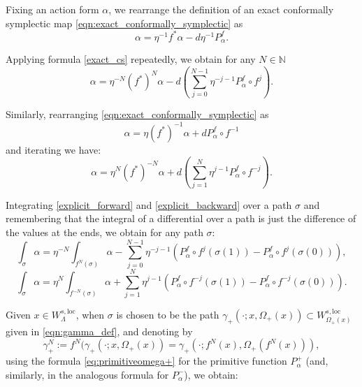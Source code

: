 \documentclass[11pt]{amsart}
\theoremstyle{definition}
\theoremstyle{remark}
\numberwithin{equation}{section}
\newcommand{\N}{\mathbb N}
\begin{document}
\medskip









Fixing an action form $\alpha$, we rearrange the definition of an exact conformally symplectic map \eqref{eqn:exact_conformally_symplectic}
as
\begin{equation}\label{exact_cs}
\alpha = \eta^{-1} f^* \alpha -d \eta^{-1}P^f_\alpha .
\end{equation}

Applying formula \eqref{exact_cs}
repeatedly,   we obtain for any $N \in \N$
\begin{equation}\label{explicit_forward}
	\alpha = \eta^{-N} (f^*)^N  \alpha -
  d \left(\sum_{j= 0}^{N-1}  \eta^{-j-1} P^f_\alpha \circ f^{j} \right).
\end{equation}


Similarly, rearranging \eqref{eqn:exact_conformally_symplectic} as
\[
\alpha = \eta (f^*)^{-1} \alpha + d P^f_\alpha\circ f^{-1}
\]
and
iterating we have:
\begin{equation}\label{explicit_backward}
  \alpha  = \eta^{N} (f^*)^{-N}\alpha +
  d \left(\sum_{j= 1}^N  \eta^{j-1} P^f_\alpha \circ f^{-j} \right).
 \end{equation}


 Integrating \eqref{explicit_forward}  and \eqref{explicit_backward} over a path $\sigma$ and
 remembering that the integral of a differential over a path  is just the difference of the values at the ends, we obtain for
 any path $\sigma$:
 \begin{equation} \label{explicit_forward_path}
   \int_\sigma \alpha =  \eta^{-N} \int_{f^N (\sigma)} \alpha
   - \sum_{j= 0}^{N-1}  \eta^{-j-1} \left( P^f_\alpha \circ f^{j}(\sigma(1)) -
     P^f_\alpha \circ f^{j}(\sigma(0)) \right),
 \end{equation}
 \begin{equation} \label{explicit_backward_path}
   \int_\sigma \alpha =  \eta^{N} \int_{f^{-N} (\sigma)} \alpha
   +\sum_{j= 1}^N  \eta^{j-1} \left( P^f_\alpha \circ f^{-j}(\sigma(1)) -
     P^f_\alpha \circ f^{-j}(\sigma(0)) \right).
 \end{equation}







Given $x \in W^{s,\mathrm{loc}}_{\Lambda}$, when  $\sigma$ is chosen to be the path $\gamma_+(\cdot;x,\Omega_+(x)) \subset W^{s,\mathrm{loc}}_{\Omega_+(x)}$ given in \eqref{eqn:gamma_def}, and denoting by
\[
\gamma^N_+:=f^N(\gamma_+(\cdot;x,\Omega_+(x))=
\gamma_+(\cdot;f^N(x),\Omega_+(f^N(x))),\]
using the formula \eqref{eq:primitiveomega+} for the primitive function $P^+_\alpha$
(and, similarly, in the analogous formula for $P^-_\alpha$), we obtain:
\end{document}
